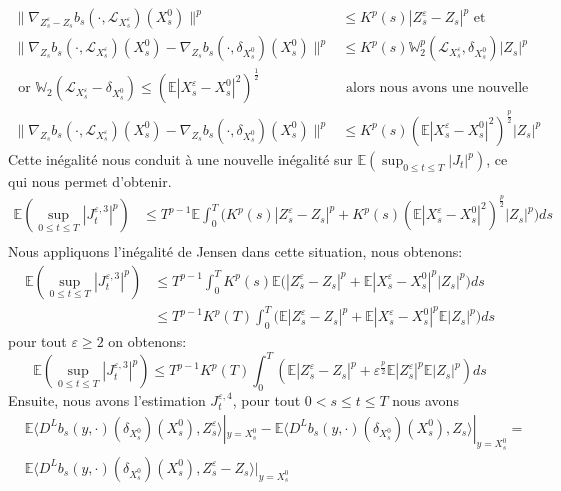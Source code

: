 \documentclass[12pt,a4paper,twoside,fleqn]{book}%
\theoremstyle{definition}
\theoremstyle{lemme}
\numberwithin{equation}{section}
\begin{document}
\[
\begin{aligned}
	\Big\|\nabla_{Z_s^\varepsilon-Z_s}b_s(\cdot, \mathcal{L}_{X_s^\varepsilon})(X_s^0)\Big\|^p&\leq K^p(s)|Z_s^\varepsilon-Z_s|^p \text{ et }\\
	 \Big\|\nabla_{Z_s}b_s(\cdot,\mathcal{L}_{X_s^\varepsilon})(X_s^0) - \nabla_{Z_s}b_s(\cdot, \delta_{X_s^0})(X_s^0)\Big\|^p&\leq K^p(s)\mathbb{W}_2^p(\mathcal{L}_{X_s^\varepsilon},\delta_{X_s^0})|Z_s|^p\\
	 \text{ or } \mathbb{W}_2(\mathcal{L}_{X_s^\varepsilon}-\delta_{X_s^0})\leq \left(\mathbb{E}|X_s^\varepsilon-X_s^0|^2\right)^{\frac{1}{2}} &\text{ alors nous avons une nouvelle inégalité}\\
	 \Big\|\nabla_{Z_s}b_s(\cdot,\mathcal{L}_{X_s^\varepsilon})(X_s^0) - \nabla_{Z_s}b_s(\cdot, \delta_{X_s^0})(X_s^0)\Big\|^p&\leq K^p(s)\left(\mathbb{E}|X_s^\varepsilon-X_s^0|^2\right)^{\frac{p}{2}}|Z_s|^p
\end{aligned}
\]
Cette inégalité nous conduit à une nouvelle inégalité sur  $\mathbb{E}\left(\sup_{0\leq t \leq T}|J_t|^p\right)$, ce qui nous permet d’obtenir.
\[
\begin{aligned}
\mathbb{E}\left(\sup_{0\leq t \leq T}|J_t^{\varepsilon,3}|^p\right)
&\leq T^{p-1} \mathbb{E}\int_{0}^{T} \Big(  K^p(s)|Z_s^\varepsilon-Z_s|^p +K^p(s) \left(\mathbb{E}|X_s^\varepsilon-X_s^0|^2\right)^{\frac{p}{2}}|Z_s|^p \Big)ds\\
\end{aligned}
\]
Nous appliquons l'inégalité de Jensen dans cette situation, nous obtenons:
\[
\begin{aligned}
\mathbb{E}\left(\sup_{0\leq t \leq T}|J_t^{\varepsilon,3}|^p\right)
&\leq T^{p-1}\int_{0}^{T} K^p(s)\mathbb{E}\Big(|Z_s^\varepsilon-Z_s|^p +\mathbb{E}|X_s^\varepsilon-X_s^0|^{p}|Z_s|^p\Big)ds\\
&\leq T^{p-1}K^p(T)\int_{0}^{T}\Big(\mathbb{E}|Z_s^\varepsilon-Z_s|^p +\mathbb{E}|X_s^\varepsilon-X_s^0|^p\mathbb{E}|Z_s|^p\Big)ds
\end{aligned}
\]
pour tout $\varepsilon\geq2$ on obtenons:
\begin{equation}\label{eq:2.2.36}
\mathbb{E}\left(\sup_{0\leq t \leq T}|J_t^{\varepsilon,3}|^p\right)\leq T^{p-1}K^p(T)\int_{0}^{T}\left(\mathbb{E}|Z_s^\varepsilon-Z_s|^p + \varepsilon^{\frac{p}{2}}\mathbb{E}|Z_s^\varepsilon|^p\mathbb{E}|Z_s|^{p}\right)ds
\end{equation}
Ensuite, nous avons l'estimation $J_t^{\varepsilon,4}$, pour tout $0< s\leq t\leq T$ nous avons
\[\begin{aligned}
&\mathbb{E}\langle D^L b_s(y, \cdot)(\delta_{X_s^0})(X_s^0), Z_s^\varepsilon\rangle|_{y=X_s^0} - \mathbb{E}\langle D^L b_s(y, \cdot)(\delta_{X_s^0})(X_s^0), Z_s\rangle|_{y=X_s^0}=\\
&\mathbb{E}\langle D^L b_s(y, \cdot)(\delta_{X_s^0})(X_s^0), Z_s^\varepsilon-Z_s\rangle|_{y=X_s^0}
\end{aligned}
\]
\end{document}
